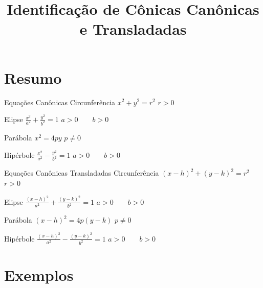 \documentclass[fleqn,aspectratio=169,12pt]{beamer}
\title{Identificação de Cônicas Canônicas e Transladadas}
\begin{document}
\addtitle

\section{Resumo}

\begin{frame}{Equações Canônicas}
  Circunferência
  \tabto{35mm}
  \(
    x^2 + y^2 = r^2
  \)
  \tabto{90mm}
  \(
    r > 0
  \)

  \pause
  \bigskip
  \bigskip
  Elipse
  \tabto{35mm}
  \(
    \frac{x^2}{a^2} + \frac{y^2}{b^2} = 1
  \)
  \tabto{90mm}
  \(
    a > 0
    \qquad
    b > 0
  \)

  \pause
  \bigskip
  \bigskip
  Parábola
  \tabto{35mm}
  \(
    x^2 = 4py
  \)
  \tabto{90mm}
  \(
    p \neq 0
  \)

  \pause
  \bigskip
  \bigskip
  Hipérbole
  \tabto{35mm}
  \(
    \frac{x^2}{a^2} - \frac{y^2}{b^2} = 1
  \)
  \tabto{90mm}
  \(
    a > 0
    \qquad
    b > 0
  \)
\end{frame}

\begin{frame}{Equações Canônicas Transladadas}
  Circunferência
  \tabto{35mm}
  \(
    (x-h)^2 + (y-k)^2 = r^2
  \)
  \tabto{90mm}
  \(
    r > 0
  \)

  \pause
  \bigskip
  \bigskip
  Elipse
  \tabto{35mm}
  \(
    \frac{(x-h)^2}{a^2} + \frac{(y-k)^2}{b^2} = 1
  \)
  \tabto{90mm}
  \(
    a > 0
    \qquad
    b > 0
  \)

  \pause
  \bigskip
  \bigskip
  Parábola
  \tabto{35mm}
  \(
    (x-h)^2 = 4p(y-k)
  \)
  \tabto{90mm}
  \(
    p \neq 0
  \)

  \pause
  \bigskip
  \bigskip
  Hipérbole
  \tabto{35mm}
  \(
    \frac{(x-h)^2}{a^2} - \frac{(y-k)^2}{b^2} = 1
  \)
  \tabto{90mm}
  \(
    a > 0
    \qquad
    b > 0
  \)
\end{frame}

\section{Exemplos}















%





\end{document}
